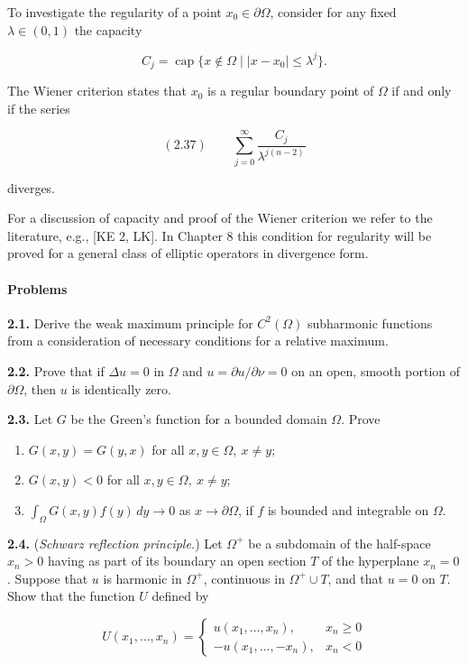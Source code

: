 To investigate the regularity of a point \(x_0 \in \partial\Omega\), consider for any fixed \(\lambda \in (0,1)\)
the capacity

\[
C_j = \operatorname{cap}\{x \notin \Omega \mid |x - x_0| \le \lambda^j\}.
\]

The Wiener criterion states that \(x_0\) is a regular boundary point of \(\Omega\) if and only if the
series

\[
(2.37)\qquad \sum_{j=0}^{\infty} \frac{C_j}{\lambda^{j(n-2)}}
\]

diverges.

For a discussion of capacity and proof of the Wiener criterion we refer to the
literature, e.g., [KE 2, LK]. In Chapter 8 this condition for regularity will be proved
for a general class of elliptic operators in divergence form.

\paragraph{Problems}

\textbf{2.1.} Derive the weak maximum principle for \(C^2(\Omega)\) subharmonic functions from
a consideration of necessary conditions for a relative maximum.

\textbf{2.2.} Prove that if \(\Delta u = 0\) in \(\Omega\) and \(u = \partial u/\partial \nu = 0\) on an open, smooth portion of \(\partial\Omega\),
then \(u\) is identically zero.

\textbf{2.3.} Let \(G\) be the Green's function for a bounded domain \(\Omega\). Prove

\begin{enumerate}
\item[(a)] \(G(x,y)=G(y,x)\) for all \(x,y\in\Omega,\ x\ne y;\)
\item[(b)] \(G(x,y)<0\) for all \(x,y\in\Omega,\ x\ne y;\)
\item[(c)] \(\displaystyle \int_{\Omega} G(x,y)f(y)\,dy \to 0\) as \(x\to \partial\Omega\), if \(f\) is bounded and integrable on \(\Omega\).
\end{enumerate}

\textbf{2.4.} (\textit{Schwarz reflection principle.}) Let \(\Omega^+\) be a subdomain of the half-space
\(x_n>0\) having as part of its boundary an open section \(T\) of the hyperplane \(x_n=0\).
Suppose that \(u\) is harmonic in \(\Omega^+\), continuous in \(\Omega^+ \cup T\), and that \(u=0\) on \(T\).
Show that the function \(U\) defined by

\[
U(x_1,\dots,x_n)=
\begin{cases}
u(x_1,\dots,x_n), & x_n\ge 0\\
-u(x_1,\dots,-x_n), & x_n<0
\end{cases}
\]

